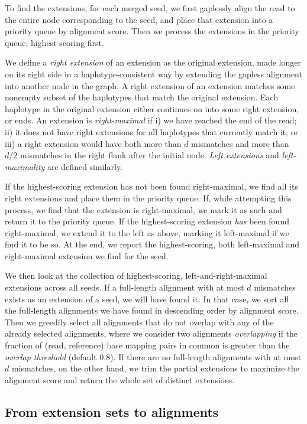 \documentclass[11pt]{ucscthesis}
\newcommand{\param}[1]{\emph{#1}}
\newcommand{\vocab}[1]{\emph{#1}}
\begin{document}
To find the extensions, for each merged seed, we first gaplessly align the read to the entire node corresponding to the seed, and place that extension into a priority queue by alignment score.
Then we process the extensions in the priority queue, highest-scoring first.

We define a \vocab{right extension} of an extension as the original extension, made longer on its right side in a haplotype-consistent way by extending the gapless alignment into another node in the graph.
A right extension of an extension matches some nonempty subset of the haplotypes that match the original extension.
Each haplotype in the original extension either continues on into some right extension, or ends.
An extension is \vocab{right-maximal} if i) we have reached the end of the read; ii) it does not have right extensions for all haplotypes that currently match it; or iii) a right extension would have both more than $d$ mismatches and more than $d/2$ mismatches in the right flank after the initial node.
\vocab{Left extensions} and \vocab{left-maximality} are defined similarly.

If the highest-scoring extension has not been found right-maximal, we find all its right extensions and place them in the priority queue.
If, while attempting this process, we find that the extension is right-maximal, we mark it as such and return it to the priority queue.
If the highest-scoring extension \emph{has} been found right-maximal, we extend it to the left as above, marking it left-maximal if we find it to be so.
At the end, we report the highest-scoring, both left-maximal and right-maximal extension we find for the seed.

We then look at the collection of highest-scoring, left-and-right-maximal extensions across all seeds.
If a full-length alignment with at most $d$ mismatches exists as an extension of a seed, we will have found it.
In that case, we sort all the full-length alignments we have found in descending order by alignment score.
Then we greedily select all alignments that do not overlap with any of the already selected alignments, where we consider two alignments \vocab{overlapping} if the fraction of (read, reference) base mapping pairs in common is greater than the \param{overlap threshold} (default 0.8).
If there are no full-length alignments with at most $d$ mismatches, on the other hand, we trim the partial extensions to maximize the alignment score and return the whole set of distinct extensions.

\subsection{From extension sets to alignments}
\label{sec:aim2:extensions-to-alignments}
\end{document}
